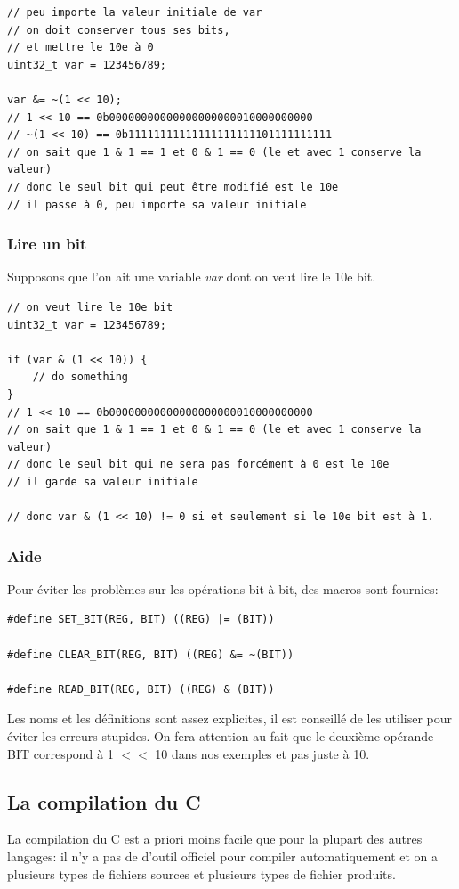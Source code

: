 \documentclass[a4paper,10pt]{article} %
\begin{document}
\begin{lstlisting}[frame=single]
// peu importe la valeur initiale de var
// on doit conserver tous ses bits,
// et mettre le 10e à 0
uint32_t var = 123456789;

var &= ~(1 << 10);
// 1 << 10 == 0b00000000000000000000010000000000
// ~(1 << 10) == 0b11111111111111111111101111111111
// on sait que 1 & 1 == 1 et 0 & 1 == 0 (le et avec 1 conserve la valeur)
// donc le seul bit qui peut être modifié est le 10e
// il passe à 0, peu importe sa valeur initiale
\end{lstlisting}

\subsubsection{Lire un bit}
Supposons que l'on ait une variable \textit{var} dont on veut lire le 10e bit.

\begin{lstlisting}[frame=single]
// on veut lire le 10e bit
uint32_t var = 123456789;

if (var & (1 << 10)) {
    // do something
}
// 1 << 10 == 0b00000000000000000000010000000000
// on sait que 1 & 1 == 1 et 0 & 1 == 0 (le et avec 1 conserve la valeur)
// donc le seul bit qui ne sera pas forcément à 0 est le 10e
// il garde sa valeur initiale

// donc var & (1 << 10) != 0 si et seulement si le 10e bit est à 1.
\end{lstlisting}

\subsubsection{Aide}
Pour éviter les problèmes sur les opérations bit-à-bit, des macros sont fournies:

\begin{lstlisting}[frame=single]
#define SET_BIT(REG, BIT) ((REG) |= (BIT))

#define CLEAR_BIT(REG, BIT) ((REG) &= ~(BIT))

#define READ_BIT(REG, BIT) ((REG) & (BIT))
\end{lstlisting}

Les noms et les définitions sont assez explicites, il est conseillé de les utiliser pour éviter les erreurs stupides. On fera attention au fait que le deuxième opérande BIT correspond à 1 $<<$ 10 dans nos exemples et pas juste à 10.

\subsection{La compilation du C}
La compilation du C est a priori moins facile que pour la plupart des autres langages: il n'y a pas de d'outil officiel pour compiler automatiquement et on a plusieurs types de fichiers sources et plusieurs types de fichier produits.\\
\end{document}
